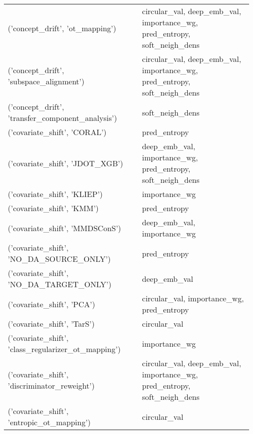 \begin{tabular}{ll}
 ('concept\_drift', 'ot\_mapping')                     & circular\_val, deep\_emb\_val, importance\_wg, pred\_entropy, soft\_neigh\_dens \\
 ('concept\_drift', 'subspace\_alignment')             & circular\_val, deep\_emb\_val, importance\_wg, pred\_entropy, soft\_neigh\_dens \\
 ('concept\_drift', 'transfer\_component\_analysis')    & soft\_neigh\_dens                                                          \\
 ('covariate\_shift', 'CORAL')                        & pred\_entropy                                                             \\
 ('covariate\_shift', 'JDOT\_XGB')                     & deep\_emb\_val, importance\_wg, pred\_entropy, soft\_neigh\_dens               \\
 ('covariate\_shift', 'KLIEP')                        & importance\_wg                                                            \\
 ('covariate\_shift', 'KMM')                          & pred\_entropy                                                             \\
 ('covariate\_shift', 'MMDSConS')                     & deep\_emb\_val, importance\_wg                                              \\
 ('covariate\_shift', 'NO\_DA\_SOURCE\_ONLY')            & pred\_entropy                                                             \\
 ('covariate\_shift', 'NO\_DA\_TARGET\_ONLY')            & deep\_emb\_val                                                             \\
 ('covariate\_shift', 'PCA')                          & circular\_val, importance\_wg, pred\_entropy                                \\
 ('covariate\_shift', 'TarS')                         & circular\_val                                                             \\
 ('covariate\_shift', 'class\_regularizer\_ot\_mapping') & importance\_wg                                                            \\
 ('covariate\_shift', 'discriminator\_reweight')       & circular\_val, deep\_emb\_val, importance\_wg, pred\_entropy, soft\_neigh\_dens \\
 ('covariate\_shift', 'entropic\_ot\_mapping')          & circular\_val                                                             \\

\end{tabular}
